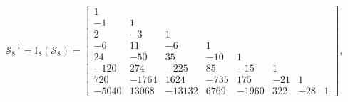 \begin{example}
\begin{displaymath}
\end{displaymath}
\begin{displaymath}
\mathcal{S}_{8}^{-1} =\operatorname{I_{ 8 }}{\left (\mathcal{S}_{ 8 } \right )} = \left[\begin{matrix}1 &  &  &  &  &  &  & \\-1 & 1 &  &  &  &  &  & \\2 & -3 & 1 &  &  &  &  & \\-6 & 11 & -6 & 1 &  &  &  & \\24 & -50 & 35 & -10 & 1 &  &  & \\-120 & 274 & -225 & 85 & -15 & 1 &  & \\720 & -1764 & 1624 & -735 & 175 & -21 & 1 & \\-5040 & 13068 & -13132 & 6769 & -1960 & 322 & -28 & 1\end{matrix}\right],
\end{displaymath}
\begin{displaymath}

\end{displaymath}
\end{example}
